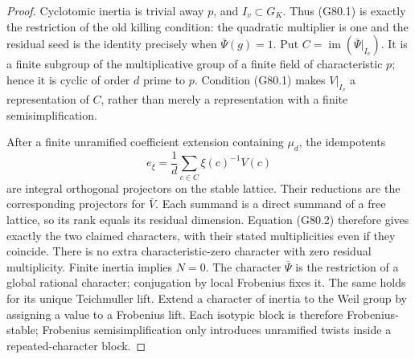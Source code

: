 \begin{proof}
Cyclotomic inertia is trivial away \(p\), and \(I_v\subset G_K\).  Thus
(G80.1) is exactly the restriction of the old killing condition: the
quadratic multiplier is one and the residual seed is the identity
precisely when \(\bar\Psi(g)=1\).
Put \(C=\operatorname{im}(\bar\Psi|_{I_v})\).  It is a finite subgroup of
the multiplicative group of a finite field of characteristic \(p\);
hence it is cyclic of order \(d\) prime to \(p\).  Condition (G80.1)
makes \(V|_{I_v}\) a representation of \(C\), rather than merely a
representation with a finite semisimplification.

After a finite unramified coefficient extension containing \(\mu_d\),
the idempotents
\[
 e_\xi=\frac1d\sum_{c\in C}\xi(c)^{-1}V(c)          \tag{G80.3}
\]
are integral orthogonal projectors on the stable lattice.  Their
reductions are the corresponding projectors for \(\bar V\).
Each summand is a direct summand of a free lattice, so its rank equals
its residual dimension.  Equation (G80.2) therefore gives exactly the
two claimed characters, with their stated multiplicities even if they
coincide.  There is no extra characteristic-zero character with zero
residual multiplicity.  Finite inertia implies \(N=0\).
The character \(\bar\Psi\) is the restriction of a global rational
character; conjugation by local Frobenius fixes it.  The same holds for
its unique Teichmuller lift.  Extend a character of inertia to the Weil
group by assigning a value to a Frobenius lift.  Each isotypic block is
therefore Frobenius-stable; Frobenius semisimplification only introduces
unramified twists inside a repeated-character block.


\end{proof}
